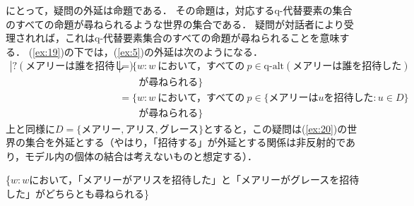 \documentclass{goken}
\newcommand{\ori}[1]{\noindent\textcolor[gray]{0.7}{\fontsize{8pt}{8pt}\selectfont{\textsf{(p.~#1)}}} }
\begin{document}
\noindent
\citeauthor{vonStechow1991}にとって，疑問の外延は命題である．
その命題は，対応するq-代替要素の集合のすべての命題が尋ねられるような世界の集合である．
疑問が対話者により受理されれば，これはq-代替要素集合のすべての命題が尋ねられることを意味する．
(\ref{ex:19})の下では，(\ref{ex:5})の外延は次のようになる．
%
\begin{equation*}\begin{split}
	|?(\text{メアリーは誰を招待した})|%
	 & =  \{w: w\ \text{において，すべての}\ p \in \text{q-alt}(\text{メアリーは誰を招待した})\\ & \quad\quad  \text{が尋ねられる}\}\\
	& = \{w: w\ \text{において，すべての}\ p \in \{\text{メアリーは$u$を招待した}: u \in D\}\\& \quad\quad \text{が尋ねられる}\}
\end{split}\end{equation*}
%
\noindent
上と同様に$D = \{\text{メアリー}, \text{アリス}, \text{グレース}\}$とすると，この疑問は(\ref{ex:20})の世界の集合を外延とする（やはり，「招待する」が外延とする関係は非反射的であり，モデル内の個体の結合は考えないものと想定する）．

\ori{25}
\begin{exe}
	\ex\label{ex:20}
	\{$w: w$において，「メアリーがアリスを招待した」と「メアリーがグレースを招待した」がどちらとも尋ねられる\}
\end{exe}
\end{document}
